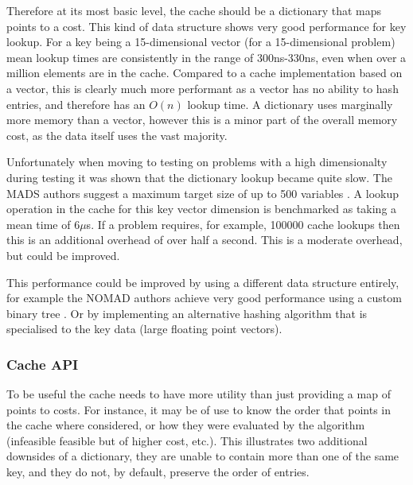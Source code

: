 Therefore at its most basic level, the cache should be a dictionary that maps points to a cost. This kind of data structure shows very good performance for key lookup. For a key being a 15-dimensional vector (for a 15-dimensional problem) mean lookup times are consistently in the range of 300ns-330ns, even when over a million elements are in the cache. Compared to a cache implementation based on a vector, this is clearly much more performant as a vector has no ability to hash entries, and therefore has an $O(n)$ lookup time. A dictionary uses marginally more memory than a vector, however this is a minor part of the overall memory cost, as the data itself uses the vast majority. 

Unfortunately when moving to testing on problems with a high dimensionalty during testing it was shown that the dictionary lookup became quite slow. The MADS authors suggest a maximum target size of up to 500 variables \cite{LeDigabel2011AlgorithmAlgorithm}. A lookup operation in the cache for this key vector dimension is benchmarked as taking a mean time of 6$\mu$s. If a problem requires, for example, 100000 cache lookups then this is an additional overhead of over half a second. This is a moderate overhead, but could be improved.

This performance could be improved by using a different data structure entirely, for example the NOMAD authors achieve very good performance using a custom binary tree \cite{LeDigabel2011AlgorithmAlgorithm}. Or by implementing an alternative hashing algorithm that is specialised to the key data (large floating point vectors). 


\subsubsection{Cache API}
To be useful the cache needs to have more utility than just providing a map of points to costs. For instance, it may be of use to know the order that points in the cache where considered, or how they were evaluated by the algorithm (infeasible feasible but of higher cost, etc.). This illustrates two additional downsides of a dictionary, they are unable to contain more than one of the same key, and they do not, by default, preserve the order of entries. 

\begin{figure}[t]
    
\end{figure}

